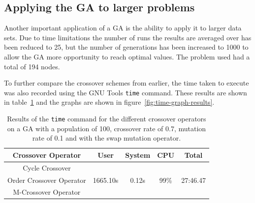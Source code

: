 \documentclass[10pt, a4paper]{article}
\begin{document}
\subsection{Applying the GA to larger problems}

Another important application of a GA is the ability to apply it to larger data
sets. Due to time limitations the number of runs the results are averaged over
has been reduced to 25, but the number of generations has been increased to 
1000 to allow the GA more opportunity to reach optimal values. The problem used
had a total of 194 nodes.

To further compare the crossover schemes from earlier, the time taken to
execute was also recorded using the GNU Tools \texttt{time} command. These
results are shown in table~\ref{tab:time-results} and the graphs are shown in
figure~\ref{fig:time-graph-results}.

\begin{table}[h]
\centering
\begin{tabular}{|c|c|c|c|c|} \hline
\textbf{Crossover Operator}	& \textbf{User}	&\textbf{System}&\textbf{CPU}	& \textbf{Total} \\ \hline
Cycle Crossover			&		&		&		& \\ \hline
Order Crossover Operator	& 1665.10s	& 0.12s		& 99\%		& 27:46.47 \\ \hline
M-Crossover Operator		& 		& 		& 		& \\ \hline
\end{tabular}
\caption{Results of the \texttt{time} command for the different crossover
         operators on a GA with a population of 100, crossover rate of 0.7,
         mutation rate of 0.1 and with the swap mutation operator.}
\label{tab:time-results}
\end{table}
\end{document}
